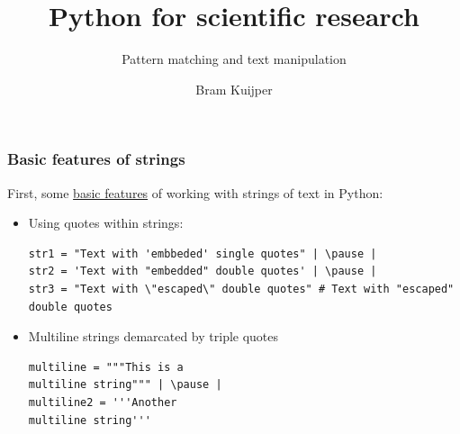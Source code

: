 \documentclass[xcolor=table]{beamer}
\title[Python for scientific research]{Python for scientific research}
\subtitle{Pattern matching and text manipulation}
\author{Bram Kuijper}
\institute[]{University of Exeter, Penryn Campus, UK}
\begin{document}
\begin{frame}
\titlepage
\end{frame}

\begin{frame}[fragile]
    \frametitle{Basic features of strings}
    First, some \href{https://docs.python.org/3/library/stdtypes.html#text-sequence-type-str}{basic features} of working with strings of text in Python:
        \begin{itemize}
            \item Using quotes within strings:
\begin{lstlisting}[style=python]
str1 = "Text with 'embbeded' single quotes" | \pause |
str2 = 'Text with "embedded" double quotes' | \pause |
str3 = "Text with \"escaped\" double quotes" # Text with "escaped" double quotes 
\end{lstlisting}
\pause
            \item Multiline strings demarcated by triple quotes 
                \pause
\begin{lstlisting}[style=python]
multiline = """This is a 
multiline string""" | \pause |
multiline2 = '''Another
multiline string'''
\end{lstlisting}
        \end{itemize}
\end{frame}
\end{document}

